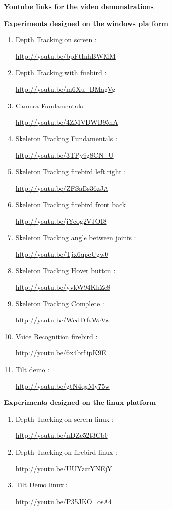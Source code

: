 \documentclass[20pt]{report}
\begin{document}
\LARGE{\textbf{Youtube links for the video demonstrations}}

\medskip

\textbf{Experiments designed on the windows platform}
\medskip

\begin{enumerate}
\item Depth Tracking on screen :

\url{http://youtu.be/bpFtInhBWMM}

\item Depth Tracking with firebird :

\url{http://youtu.be/m6Xu\_BMagVg}

\item Camera Fundamentals :

\url{http://youtu.be/4ZMVDWB95hA}

\item Skeleton Tracking Fundamentals :

\url{http://youtu.be/3TPy9g8CN\_U}

\item Skeleton Tracking firebird left right :

\url{http://youtu.be/ZFSaBs36zJA}

\item Skeleton Tracking firebird front back :

\url{http://youtu.be/jYcog2VJOI8}

\item Skeleton Tracking angle between joints :

\url{http://youtu.be/Tjx6qpeUgw0}

\item Skeleton Tracking Hover button :

\url{http://youtu.be/yvkW94KhZe8}

\item Skeleton Tracking Complete :

\url{http://youtu.be/WedDifsWeVw}

\item Voice Recognition firebird :

\url {http://youtu.be/6x4br5ipK9E}

\item Tilt demo :

\url{http://youtu.be/gtN4qgMy75w}

\end{enumerate}

\medskip
\textbf{Experiments designed on the linux platform}

\medskip

\begin{enumerate}
\item Depth Tracking on screen linux :

\url{http://youtu.be/nDZc52t3Cb0}

\item Depth Tracking on firebird linux :

\url{http://youtu.be/UUYzcrYNEjY}

\item Tilt Demo linux :

\url{http://youtu.be/P35JKO\_osA4}
\end{enumerate}
\end{document}
